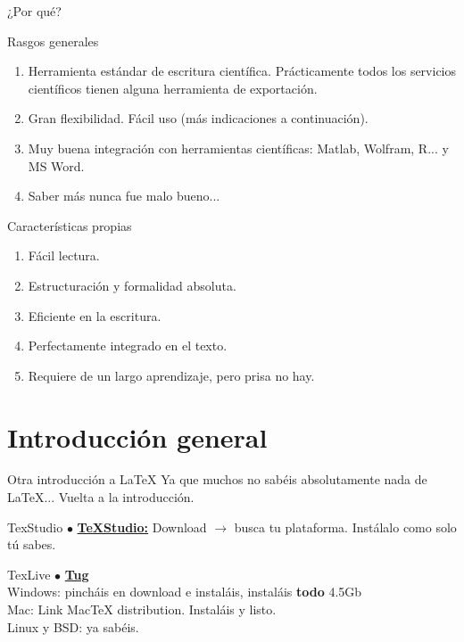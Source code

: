\documentclass{beamer}
\begin{document}
\begin{frame}{¿Por qué?}
	\small \vspace{-6pt}
	\begin{block}{Rasgos generales}
		\begin{enumerate}
			\item Herramienta estándar de escritura científica. Prácticamente todos los servicios científicos tienen alguna herramienta de exportación.
			\item Gran flexibilidad. Fácil uso (más indicaciones a continuación).
			\item Muy buena integración con herramientas científicas: Matlab, Wolfram, R... y MS Word.
			\item Saber más nunca fue malo \tiny bueno... \small
		\end{enumerate}
	\end{block}
	\vspace{-6pt}
	\begin{block}{Características propias}
		\begin{enumerate}
			\item Fácil lectura.
			\item Estructuración y formalidad absoluta.
			\item Eficiente en la escritura.
			\item Perfectamente integrado en el texto.
			\item Requiere de un largo aprendizaje, pero prisa no hay.
		\end{enumerate}
	\end{block}
\end{frame}

\section{Introducción general}

\begin{frame}{Otra introducción a \LaTeX}
	Ya que muchos no sabéis absolutamente nada de \LaTeX... Vuelta a la introducción. \\
	\begin{block}{TexStudio}
		$\bullet$ \href{http://www.texstudio.org/}{\textbf{\TeX Studio:}} Download $\rightarrow$ busca tu plataforma. Instálalo como solo tú sabes.
	\end{block}
	
	\begin{block}{TexLive}
		$\bullet$ \href{https://www.tug.org/texlive/}{\textbf{Tug}} \\
		Windows: pincháis en download e instaláis, instaláis \textbf{todo} 4.5Gb \\
		Mac: Link MacTeX distribution. Instaláis y listo. \\
		Linux y BSD: ya sabéis.
	\end{block}	
\end{frame}
\end{document}
